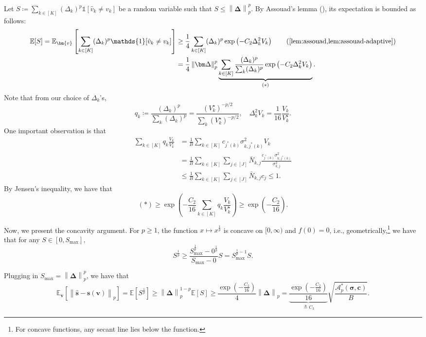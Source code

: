 \documentclass{article}
\def\vc{{\bm{c}}}
\def\vs{{\bm{s}}}
\def\vv{{\bm{v}}}
\def\gA{{\mathcal{A}}}
\newcommand{\E}{\mathbb{E}}
\theoremstyle{plain}
\theoremstyle{definition}
\theoremstyle{plain}
\newcommand{\bignorm}[1]{\left\lVert #1 \right\rVert}
\newcommand{\indicator}{\mathds{1}}
\begin{document}
Let $S \coloneq \sum_{k \in [K]} (\Delta_k)^p \indicator[\hat{v}_k \neq v_k]$ be a random variable such that $S \leq \bignorm{\bm\Delta}_p^p$.
By Assouad's lemma (), its expectation is bounded as follows:
\begin{align}
    \E[S] = \E_{\vv}\left[ \sum_{k \in [K]} (\Delta_k)^p \indicator[\hat{v}_k \neq v_k] \right]
    &\geq \frac{1}{4} \sum_{k \in [K]} (\Delta_k)^p \exp\left( - C_2 \Delta_k^2 V_k \right) \tag{\Cref{lem:assouad,lem:assouad-adaptive}} \\
    &= \frac{1}{4} \bignorm{\bm\Delta}_p^p \underbrace{\sum_{k \in [K]} \frac{(\Delta_k)^p}{\sum_k (\Delta_k)^p} \exp\left( - C_2 \Delta_k^2 V_k \right)}_{(*)}.
\end{align}
Note that from our choice of $\Delta_k$'s,
\begin{equation}
    q_k \coloneq \frac{(\Delta_k)^p}{\sum_k (\Delta_k)^p} = \frac{(V_k^\star)^{-p/2}}{\sum_k (V_k^\star)^{-p/2}}, \quad \Delta_k^2 V_k = \frac{1}{16} \frac{V_k}{V_k^\star}.
\end{equation}
One important observation is that
\begin{align}
    \sum_{k \in [K]} q_k \frac{V_k}{V_k^\star} 
    &= \frac{1}{B} \sum_{k \in [K]} c_{j^*(k)} \sigma_{k,j^*(k)}^2 V_k \tag{Direct computation} \\
    &= \frac{1}{B} \sum_{k \in [K]} \sum_{j \in [J]} \bar{N}_{k,j} \frac{c_{j^*(k)} \sigma_{k,j^*(k)}^2}{\sigma_{k,j}^2} \\
    &\leq \frac{1}{B} \sum_{k \in [K]} \sum_{j \in [J]} \bar{N}_{k,j} c_j
    \leq 1.
\end{align}
By Jensen's inequality, we have that
\begin{equation}
    (*) \geq \exp\left( -\frac{C_2}{16} \sum_{k \in [K]} q_k \frac{V_k}{V_k^\star} \right)
    \geq \exp\left( -\frac{C_2}{16} \right).
\end{equation}

Now, we present the concavity argument.
For $p \geq 1$, the function $x \mapsto x^{\frac{1}{p}}$ is concave on $[0, \infty)$ and $f(0) = 0$, i.e., geometrically,\footnote{For concave functions, any secant line lies below the function.} we have that for any $S \in [0, S_{\max}],$
\begin{equation}
    S^{\frac{1}{p}} \geq \frac{S_{\max}^{\frac{1}{p}} - 0^{\frac{1}{p}}}{S_{\max} - 0} S = S_{\max}^{\frac{1}{p} - 1} S.
\end{equation}

Plugging in $S_{\max} = \bignorm{\bm\Delta}_p^p$, we have that
\begin{equation}
    \E_{\vv}\left[ \bignorm{\hat{\vs} - \vs(\vv)}_p \right] = \E\left[ S^{\frac{1}{p}} \right]
    \geq \bignorm{\bm\Delta}_p^{1-p} \E[S]
    \geq \frac{\exp\left( -\frac{C_2}{16} \right)}{4} \bignorm{\bm\Delta}_p = \underbrace{\frac{\exp\left( -\frac{C_2}{16} \right)}{16}}_{\triangleq C_3} \sqrt{\frac{\gA_p^*(\bm\sigma, \vc)}{B}}.
\end{equation}
\end{document}
